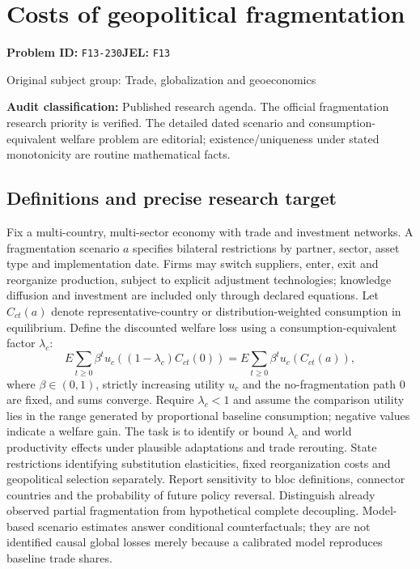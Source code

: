 \documentclass[11pt,a4paper]{article}
\begin{document}
\section*{Costs of geopolitical fragmentation}
\textbf{Problem ID:} \texttt{F13-230}\quad \textbf{JEL:} \texttt{F13}\par
\label{problem:OP-0344}
\label{audited:ECON-078}
{\sffamily\small\color{muted}Original subject group: Trade, globalization and geoeconomics\par}
\label{definitions:problem:30007626}
\textbf{Audit classification:} Published research agenda. The official fragmentation research priority is verified. The detailed dated scenario and consumption-equivalent welfare problem are editorial; existence/uniqueness under stated monotonicity are routine mathematical facts.
\subsection*{Definitions and precise research target}
Fix a multi-country, multi-sector economy with trade and investment networks. A fragmentation scenario \(a\) specifies bilateral restrictions by partner, sector, asset type and implementation date. Firms may switch suppliers, enter, exit and reorganize production, subject to explicit adjustment technologies; knowledge diffusion and investment are included only through declared equations. Let \(C_{ct}(a)\) denote representative-country or distribution-weighted consumption in equilibrium. Define the discounted welfare loss using a consumption-equivalent factor \(\lambda_c\):
\[E\sum_{t\geq0}\beta^t u_c((1-\lambda_c)C_{ct}(0))=E\sum_{t\geq0}\beta^t u_c(C_{ct}(a)),\]
where \(\beta\in(0,1)\), strictly increasing utility \(u_c\) and the no-fragmentation path \(0\) are fixed, and sums converge. Require \(\lambda_c<1\) and assume the comparison utility lies in the range generated by proportional baseline consumption; negative values indicate a welfare gain. The task is to identify or bound \(\lambda_c\) and world productivity effects under plausible adaptations and trade rerouting. State restrictions identifying substitution elasticities, fixed reorganization costs and geopolitical selection separately. Report sensitivity to bloc definitions, connector countries and the probability of future policy reversal. Distinguish already observed partial fragmentation from hypothetical complete decoupling. Model-based scenario estimates answer conditional counterfactuals; they are not identified causal global losses merely because a calibrated model reproduces baseline trade shares.
\end{document}
